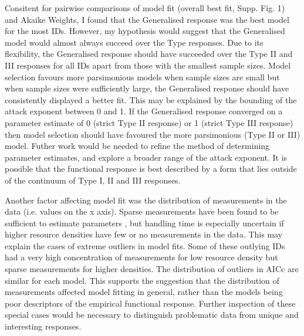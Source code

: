 \documentclass[11pt]{article}
\begin{document}
        Consitent for pairwise comparisons of model fit (overall best fit, Supp. Fig. 1) and Akaike Weights, I found that the Generalised response was the best model for the most IDs. However, my hypothesis would suggest that the Generalised model would almost always succeed over the Type responses. Due to its flexibility, the Generalised response should have succeeded over the Type II and III responses for all IDs apart from those with the smallest sample sizes. Model selection favours more parsimonious models when sample sizes are small \citep{johnson2004model} but when sample sizes were sufficiently large, the Generalised response should have consistently displayed a better fit. This may be explained by the bounding of the attack exponent between 0 and 1. If the Generalised response converged on a parameter estimate of 0 (strict Type II response) or 1 (strict Type III response) then model selection should have favoured the more parsimonious (Type II or III) model. Futher work would be needed to refine the method of determining parameter estimates, and explore a broader range of the attack exponent. It is possible that the functional response is best described by a form that lies outside of the continuum of Type I, II and III responses.

        Another factor affecting model fit was the distribution of measurements in the data (i.e. values on the x axis). Sparse measurements have been found to be sufficient to estimate parameters \citep{rosenbaum2018fitting}, but handling time is especially uncertain if higher resource densities have few or no measurements in the data. This may explain the cases of extreme outliers in model fits. Some of these outlying IDs had a very high concentration of measurements for low resource density but sparse measurements for higher densities. The distribution of outliers in AICc are similar for each model. This supports the suggestion that the distribution of measurements affected model fitting in general, rather than the models being poor descriptors of the empirical functional response. Further inspection of these special cases would be necessary to distinguish problematic data from unique and interesting responses.
\end{document}
